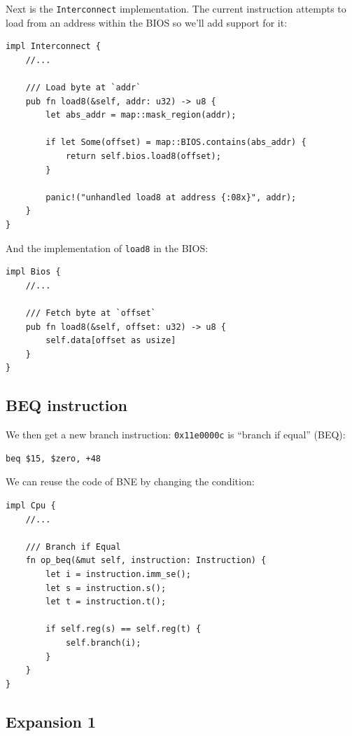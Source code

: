 \documentclass[a4paper]{article}
\newcommand{\code}[1] {\texttt{#1}}
\begin{document}
Next is the \code{Interconnect} implementation. The current
instruction attempts to load from an address within the BIOS so we'll
add support for it:

\begin{lstlisting}
impl Interconnect {
    //...

    /// Load byte at `addr`
    pub fn load8(&self, addr: u32) -> u8 {
        let abs_addr = map::mask_region(addr);

        if let Some(offset) = map::BIOS.contains(abs_addr) {
            return self.bios.load8(offset);
        }

        panic!("unhandled load8 at address {:08x}", addr);
    }
}
\end{lstlisting}

And the implementation of \code{load8} in the BIOS:

\begin{lstlisting}
impl Bios {
    //...

    /// Fetch byte at `offset`
    pub fn load8(&self, offset: u32) -> u8 {
        self.data[offset as usize]
    }
}
\end{lstlisting}

\subsection{BEQ instruction}

We then get a new branch instruction: \code{0x11e0000c} is ``branch if
equal'' (BEQ):

\begin{lstlisting}[language=assembly]
beq $15, $zero, +48
\end{lstlisting}

We can reuse the code of BNE by changing the condition:

\begin{lstlisting}
impl Cpu {
    //...

    /// Branch if Equal
    fn op_beq(&mut self, instruction: Instruction) {
        let i = instruction.imm_se();
        let s = instruction.s();
        let t = instruction.t();

        if self.reg(s) == self.reg(t) {
            self.branch(i);
        }
    }
}
\end{lstlisting}

\subsection{Expansion 1}
\end{document}
